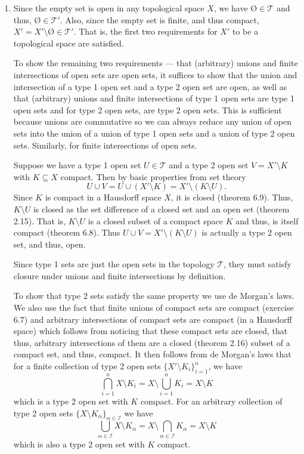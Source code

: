 \documentclass[12 pt, letterpaper]{hmcpset}
\begin{document}
\begin{solution}
	\begin{enumerate}
		\item Since the empty set is open in any topological space $X$, we have $\text{\O} \in \mathcal{T}$ and thus, $\text{\O} \in \mathcal{T}'$. Also, since the empty set is finite, and thus compact, $X' = X' \setminus \text{\O} \in \mathcal{T}'$. That is, the first two requirements for $X'$ to be a topological space are satisfied.

			To show the remaining two requirements --- that (arbitrary) unions and finite intersections of open sets are open sets, it suffices to show that the union and intersection of a type 1 open set and a type 2 open set are open, as well as that (arbitrary) unions and finite intersections of type 1 open sets are type 1 open sets and for type 2 open sets, are type 2 open sets. This is sufficient because unions are commutative so we can always reduce any union of open sets into the union of a union of type 1 open sets and a union of type 2 open sets. Similarly, for finite intersections of open sets.

			Suppose we have a type 1 open set $U \in \mathcal{T}$ and a type 2 open set $V = X' \setminus K$ with $K \subseteq X$ compact. Then by basic properties from set theory
			\[
				U \cup V = U \cup (X' \setminus K) = X' \setminus (K \setminus U).
			\]
			Since $K$ is compact in a Hausdorff space $X$, it is closed (theorem 6.9). Thus, $K \setminus U$ is closed as the set difference of a closed set and an open set (theorem 2.15). That is,  $K \setminus U$ is a closed subset of a compact space $K$ and thus, is itself compact (theorem 6.8). Thus $U \cup V = X' \setminus (K \setminus U)$ is actually a type 2 open set, and thus, open.

			Since type 1 sets are just the open sets in the topology $\mathcal{T}$, they must satisfy closure under unions and finite intersections by definition.

			To show that type 2 sets satisfy the same property we use de Morgan's laws. We also use the fact that finite unions of compact sets are compact (exercise 6.7) and arbitrary intersections of compact sets are compact (in a Hausdorff space) which follows from noticing that these compact sets are closed, that thus, arbitrary intersections of them are a closed (theorem 2.16) subset of a compact set, and thus, compact. It then follows from de Morgan's laws that for a finite collection of type 2 open sets $\{ X' \setminus K_{i} \}_{i = 1}^{n}$, we have
			\[
				\bigcap_{i = 1}^{n} X \setminus K_{i} = X \setminus \bigcup_{i = 1}^{n} K_{i} = X \setminus K
			\]
			which is a type 2 open set with $K$ compact. For an arbitrary collection of type 2 open sets $\{ X \setminus K_{\alpha} \}_{\alpha \in \mathcal{I}}$ we have
			\[
				\bigcup_{\alpha \in \mathcal{I}} X \setminus K_{\alpha} = X \setminus \bigcap_{\alpha \in \mathcal{I}} K_{\alpha} = X \setminus K
			\]
			which is also a type 2 open set with $K$ compact.


\end{enumerate}
\end{solution}
\end{document}
